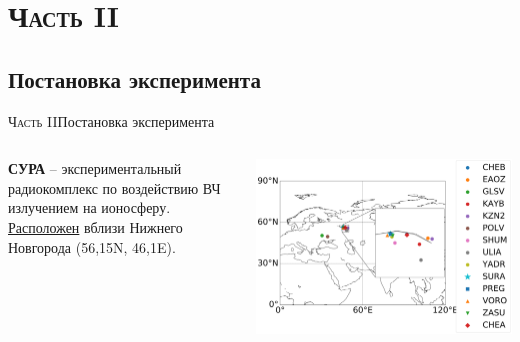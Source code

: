 \section{\textsc{Часть II}}

\subsection{Постановка эксперимента}
\begin{frame}{\textsc{Часть II}}{Постановка эксперимента}
\begin{columns}
\begin{column}{0.3\textwidth}
\textbf{СУРА} -- экспериментальный радиокомплекс по воздействию ВЧ излучением на ионосферу. \href{https://clck.ru/NfWnc}{Расположен} вблизи Нижнего Новгорода (56,15\degree N, 46,1\degree E). 
\end{column}
\begin{column}{0.7\textwidth}
\includegraphics[width=\textwidth]{../fig/sites.png}  
\end{column}
\end{columns}
\end{frame}


